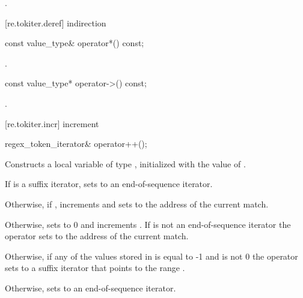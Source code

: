 \begin{itemdescr}
\pnum\returns  {}.
\end{itemdescr}

[re.tokiter.deref]{ indirection}

%
%
\begin{itemdecl}
const value_type& operator*() const;
\end{itemdecl}

\begin{itemdescr}
\pnum\returns  {}.
\end{itemdescr}


%
%
\begin{itemdecl}
const value_type* operator->() const;
\end{itemdecl}

\begin{itemdescr}
\pnum\returns  {}.
\end{itemdescr}


[re.tokiter.incr]{ increment}

%
%
\begin{itemdecl}
regex_token_iterator& operator++(); 
\end{itemdecl}

\begin{itemdescr}
\pnum
\effects  Constructs a local variable  of
type , initialized with the value
of .

\pnum
If  is a suffix iterator, sets  to an
end-of-sequence iterator. 

\pnum
Otherwise, if , increments  and
sets  to the address of the current match.

\pnum
Otherwise, sets  to 0 and
increments . If  is not an
end-of-sequence iterator the operator sets  to the
address of the current match. 

\pnum
Otherwise, if any of the values stored in  is equal to -1 and
 is not 0 the operator sets  to a
suffix iterator that points to the range .

\pnum
Otherwise, sets  to an end-of-sequence iterator.

\returns  {}
\end{itemdescr}


